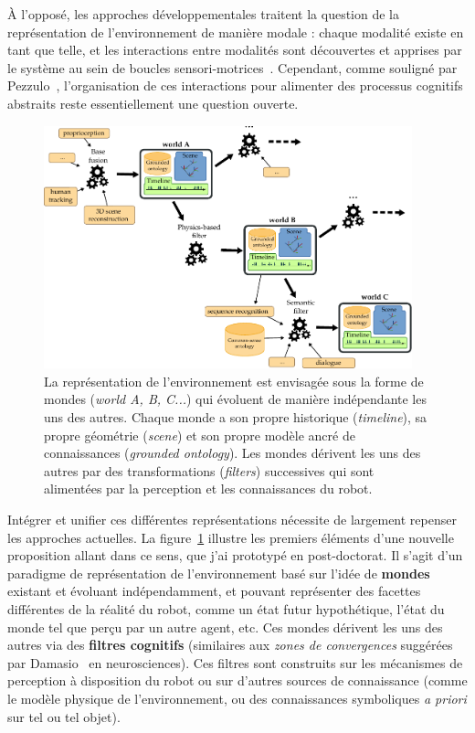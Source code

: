 \documentclass[a4paper]{article}
\begin{document}
À l'opposé, les approches développementales traitent la question de la
représentation de l'environnement de manière modale : chaque modalité existe en
tant que telle, et les interactions entre modalités sont découvertes et apprises
par le système au sein de boucles sensori-motrices~\cite{morse2010epigenetic,
mihoub2014modeling}. Cependant, comme souligné
par Pezzulo~\cite{pezzulo2012computational}, l'organisation de ces interactions
pour alimenter des processus cognitifs abstraits reste essentiellement une
question ouverte.

\begin{figure}
    \centering
\includegraphics[width=0.95\textwidth]{figs/worlds}
\caption{\small La représentation de l'environnement est envisagée sous la forme
    de mondes (\emph{world A, B, C...}) qui évoluent de manière indépendante les
    uns des autres. Chaque monde a son propre historique (\emph{timeline}), sa
    propre géométrie (\emph{scene}) et son propre modèle ancré de connaissances
    (\emph{grounded ontology}).  Les mondes dérivent les uns des autres par des
    transformations (\emph{filters}) successives qui sont alimentées par la
    perception et les connaissances du robot.  }

\label{worlds}
\end{figure}

Intégrer et unifier ces différentes représentations nécessite de largement
repenser les approches actuelles. La figure~\ref{worlds} illustre les premiers
éléments d'une nouvelle proposition allant dans ce sens, que j'ai prototypé en
post-doctorat. Il s'agit d'un paradigme de représentation de l'environnement
basé sur l'idée de \textbf{mondes} existant et évoluant indépendamment, et
pouvant représenter des facettes différentes de la réalité du robot, comme un
état futur hypothétique, l'état du monde tel que perçu par un autre agent,
etc. Ces mondes dérivent les uns des autres via des \textbf{filtres cognitifs}
(similaires aux \emph{zones de convergences} suggérées par
Damasio~\cite{damasio1989time} en neurosciences). Ces filtres sont construits
sur les mécanismes de perception à disposition du robot ou sur d'autres sources de
connaissance (comme le modèle physique de l'environnement, ou des connaissances
symboliques \textit{a priori} sur tel ou tel objet).
\end{document}

